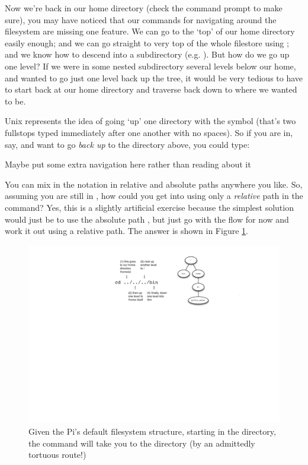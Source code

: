 Now we're back in our home directory (check the command prompt to make sure), you may have noticed that our commands for navigating around the filesystem are missing one feature. We can go to the `top' of our home directory easily enough; and we can go straight to very top of the whole filestore using ; and we know how to descend into a subdirectory (e.g. ). But how do we go up one level? If we were in some nested subdirectory several levels below our home, and wanted to go just one level back up the tree, it would be very tedious to have to start back at our home directory and traverse back down to where we wanted to be. 

Unix represents the idea of going `up' one directory with the  symbol (that's two fullstops typed immediately after one another with no spaces). So if you are in, say,  and want to go \textit{back up} to the directory above, you could type:


\begin{note}
Maybe put some extra navigation here rather than reading about it
\end{note}

You can mix in the  notation in relative and absolute paths anywhere you like. So, assuming you are still in , how could you get into  using only a \textit{relative} path in the  command? Yes, this is a slightly artificial exercise because the simplest solution would just be to use the absolute path , but just go with the flow for now and work it out using a relative path. The answer is shown in Figure \ref{figure:simple-navigation}. 

\begin{figure}[t]
\centerline{\includegraphics[width=13.5cm]{images/simple-navigation}}
\caption{Given the Pi's default filesystem structure, starting in the  directory, the command  will take you to the  directory (by an admittedly tortuous route!)}\label{figure:simple-navigation}
\end{figure}


